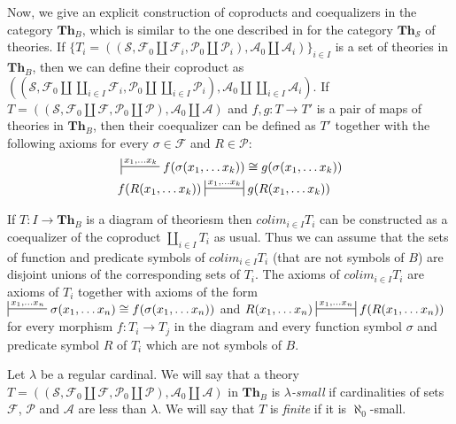 \documentclass[reqno]{amsart}
\theoremstyle{definition}
\theoremstyle{remark}
\newcommand{\cat}[1]{\mathbf{#1}}
\newcommand{\Th}{\cat{Th}}
\numberwithin{figure}{section}
\begin{document}
Now, we give an explicit construction of coproducts and coequalizers in the category $\Th_B$,
which is similar to the one described in \cite{alg-tt} for the category $\Th_\mathcal{S}$ of theories.
If $\{ T_i = ((\mathcal{S}, \mathcal{F}_0 \amalg \mathcal{F}_i, \mathcal{P}_0 \amalg \mathcal{P}_i), \mathcal{A}_0 \amalg \mathcal{A}_i) \}_{i \in I}$
is a set of theories in $\Th_B$, then we can define their coproduct as
$((\mathcal{S}, \mathcal{F}_0 \amalg \coprod_{i \in I} \mathcal{F}_i, \mathcal{P}_0 \amalg \coprod_{i \in I} \mathcal{P}_i), \mathcal{A}_0 \amalg \coprod_{i \in I} \mathcal{A}_i)$.
If $T = ((\mathcal{S}, \mathcal{F}_0 \amalg \mathcal{F}, \mathcal{P}_0 \amalg \mathcal{P}), \mathcal{A}_0 \amalg \mathcal{A})$
and $f,g : T \to T'$ is a pair of maps of theories in $\Th_B$, then their coequalizer can be defined as $T'$ together with the following axioms for every $\sigma \in \mathcal{F}$ and $R \in \mathcal{P}$:
\begin{align*}
& \sststile{}{x_1, \ldots x_k} f(\sigma(x_1, \ldots x_k)) \cong g(\sigma(x_1, \ldots x_k)) \\
& f(R(x_1, \ldots x_k)) \ssststile{}{x_1, \ldots x_k} g(R(x_1, \ldots x_k))
\end{align*}

If $T : I \to \Th_B$ is a diagram of theoriesm then $colim_{i \in I} T_i$ can be constructed as a coequalizer of the coproduct $\coprod_{i \in I} T_i$ as usual.
Thus we can assume that the sets of function and predicate symbols of $colim_{i \in I} T_i$ (that are not symbols of $B$) are disjoint unions of the corresponding sets of $T_i$.
The axioms of $colim_{i \in I} T_i$ are axioms of $T_i$ together with axioms of the form $\sststile{}{x_1, \ldots x_n} \sigma(x_1, \ldots x_n) \cong f(\sigma(x_1, \ldots x_n))$
and $R(x_1, \ldots x_n) \ssststile{}{x_1, \ldots x_n} f(R(x_1, \ldots x_n))$ for every morphism $f : T_i \to T_j$
in the diagram and every function symbol $\sigma$ and predicate symbol $R$ of $T_i$ which are not symbols of $B$.

Let $\lambda$ be a regular cardinal.
We will say that a theory $T = ((\mathcal{S}, \mathcal{F}_0 \amalg \mathcal{F}, \mathcal{P}_0 \amalg \mathcal{P}), \mathcal{A}_0 \amalg \mathcal{A})$
in $\Th_B$ is \emph{$\lambda$-small} if cardinalities of sets $\mathcal{F}$, $\mathcal{P}$ and $\mathcal{A}$ are less than $\lambda$.
We will say that $T$ is \emph{finite} if it is $\aleph_0$-small.
\end{document}
